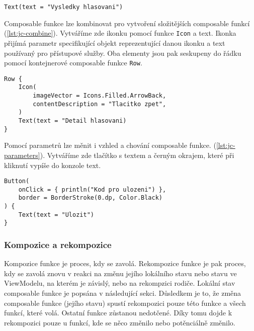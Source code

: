 \begin{lstlisting}[caption={Příklad použití composable funkce Text.}, label={lst:jc-text}]
Text(text = "Vysledky hlasovani")
\end{lstlisting}

\noindent Composable funkce lze kombinovat pro vytvoření složitějších composable funkcí (\ref{lst:jc-combine}). Vytváříme zde ikonku pomocí funkce \lstinline|Icon| a text. Ikonka přijímá parametr specifikující objekt reprezentující danou ikonku a text používaný pro přístupové služby. Oba elementy jsou pak seskupeny do řádku pomocí kontejnerové composable funkce \lstinline|Row|.

\begin{lstlisting}[caption={Příklad skládání composable funkcí. Vykreslí ikonku a text vedle sebe.}, label={lst:jc-combine}, tabsize=2]
Row {
	Icon(
		imageVector = Icons.Filled.ArrowBack,
		contentDescription = "Tlacitko zpet",
	)
	Text(text = "Detail hlasovani)
}
\end{lstlisting}

\noindent Pomocí parametrů lze měnit i vzhled a chování composable funkce. (\ref{lst:jc-parameters}). Vytváříme zde tlačítko  s textem a černým okrajem, které při kliknutí vypíše do konzole text.

\begin{lstlisting}[caption={Příklad parametrů pro změnu vzhledu a chování.}, label={lst:jc-parameters}, tabsize=2]
Button(
	onClick = { println("Kod pro ulozeni") },
	border = BorderStroke(0.dp, Color.Black)
) {
	Text(text = "Ulozit")
}
\end{lstlisting}

\vspace*{10px}

\subsubsection*{Kompozice a rekompozice}
Kompozice funkce je proces, kdy se zavolá. Rekompozice funkce je pak proces, kdy se zavolá znovu v reakci na změnu jejího lokálního stavu nebo stavu ve ViewModelu, na kterém je závislý, nebo na rekompzici rodiče. Lokální stav composable funkce je popsána v následující sekci. Důsledkem je to, že změna composable funkce (jejího stavu) spustí rekompozici pouze této funkce a všech funkcí, které volá. Ostatní funkce zůstanou nedotčené. Díky tomu dojde k rekompozici pouze u funkcí, kde se něco změnilo nebo potěnciálně změnilo.

\vspace*{10px}


